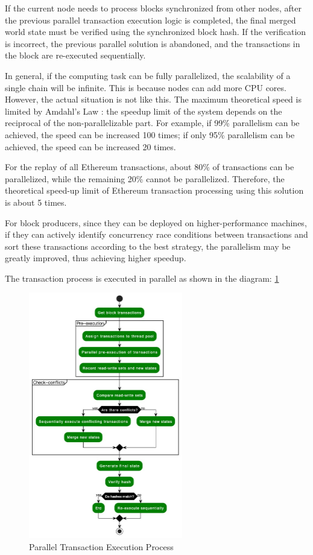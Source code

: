 If the current node needs to process blocks synchronized from other nodes, after the previous parallel transaction execution logic is completed, the final merged world state must be verified using the synchronized block hash. If the verification is incorrect, the previous parallel solution is abandoned, and the transactions in the block are re-executed sequentially.

In general, if the computing task can be fully parallelized, the scalability of a single chain will be infinite. This is because nodes can add more CPU cores. However, the actual situation is not like this. The maximum theoretical speed is limited by Amdahl's Law \cite{website:Amdahls-law}: the speedup limit of the system depends on the reciprocal of the non-parallelizable part. For example, if 99\% parallelism can be achieved, the speed can be increased 100 times; if only 95\% parallelism can be achieved, the speed can be increased 20 times.

For the replay of all Ethereum transactions, about 80\% of transactions can be parallelized, while the remaining 20\% cannot be parallelized. Therefore, the theoretical speed-up limit of Ethereum transaction processing using this solution is about 5 times.

For block producers, since they can be deployed on higher-performance machines, if they can actively identify concurrency race conditions between transactions and sort these transactions according to the best strategy, the parallelism may be greatly improved, thus achieving higher speedup.

The transaction process is executed in parallel as shown in the diagram: \ref{fig:paralle-execution}

\begin{figure}[!ht]
    \centering
    \includegraphics[width=0.6\textwidth]{images/paralle-execution.jpg}
    \caption{Parallel Transaction Execution Process}
    \label{fig:paralle-execution}
\end{figure}


